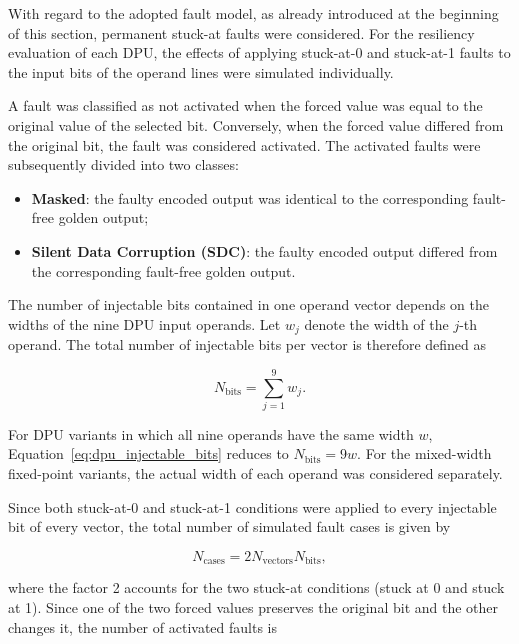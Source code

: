 
With regard to the adopted fault model, as already introduced at the
beginning of this section, permanent stuck-at faults were considered.
For the resiliency evaluation of each DPU, the effects of applying
stuck-at-0 and stuck-at-1 faults to the input bits of the operand lines
were simulated individually.

A fault was classified as not activated when the forced value was equal
to the original value of the selected bit. Conversely, when the forced
value differed from the original bit, the fault was considered
activated. The activated faults were subsequently divided into two
classes:

\begin{itemize}
    \item \textbf{Masked}: the faulty encoded output was identical to
    the corresponding fault-free golden output;

    \item \textbf{Silent Data Corruption (SDC)}: the faulty encoded
    output differed from the corresponding fault-free golden output.
\end{itemize}

The number of injectable bits contained in one operand vector depends on
the widths of the nine DPU input operands. Let $w_j$ denote the width of
the $j$-th operand. The total number of injectable bits per vector is
therefore defined as

\begin{equation}
N_{\mathrm{bits}}
=
\sum_{j=1}^{9} w_j .
\label{eq:dpu_injectable_bits}
\end{equation}

For DPU variants in which all nine operands have the same width $w$,
Equation~\ref{eq:dpu_injectable_bits} reduces to
$N_{\mathrm{bits}}=9w$. For the mixed-width fixed-point variants, the
actual width of each operand was considered separately.

Since both stuck-at-0 and stuck-at-1 conditions were applied to every
injectable bit of every vector, the total number of simulated fault
cases is given by

\begin{equation}
N_{\mathrm{cases}}
=
2 N_{\mathrm{vectors}} N_{\mathrm{bits}},
\label{eq:dpu_total_fault_cases}
\end{equation}

where the factor 2 accounts for the two stuck-at conditions (stuck at 0 and stuck at 1). Since one of the two forced values preserves the original bit and the other changes it, the number of activated faults is

